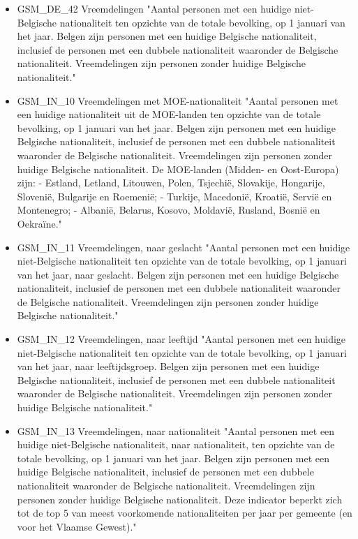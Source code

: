 \documentclass{SVnote}
\begin{document}
\begin{itemize}
\item GSM\_DE\_42	Vreemdelingen		"Aantal personen met een huidige niet-Belgische nationaliteit ten opzichte van de totale bevolking, op 1 januari van het jaar.
Belgen zijn personen met een huidige Belgische nationaliteit, inclusief de personen met een dubbele nationaliteit waaronder de Belgische nationaliteit. Vreemdelingen zijn personen zonder huidige Belgische nationaliteit."
\item GSM\_IN\_10	Vreemdelingen met MOE-nationaliteit		"Aantal personen met een huidige nationaliteit uit de MOE-landen ten opzichte van de totale bevolking, op 1 januari van het jaar.
Belgen zijn personen met een huidige Belgische nationaliteit, inclusief de personen met een dubbele nationaliteit waaronder de Belgische nationaliteit. Vreemdelingen zijn personen zonder huidige Belgische nationaliteit.
De MOE-landen (Midden- en Oost-Europa) zijn:
- Estland, Letland, Litouwen, Polen, Tsjechië, Slovakije, Hongarije, Slovenië, Bulgarije en Roemenië;
- Turkije, Macedonië, Kroatië, Servië en Montenegro;
- Albanië, Belarus, Kosovo, Moldavië, Rusland, Bosnië en Oekraïne."
\item GSM\_IN\_11	Vreemdelingen, naar geslacht		"Aantal personen met een huidige niet-Belgische nationaliteit ten opzichte van de totale bevolking, op 1 januari van het jaar, naar geslacht.
Belgen zijn personen met een huidige Belgische nationaliteit, inclusief de personen met een dubbele nationaliteit waaronder de Belgische nationaliteit. Vreemdelingen zijn personen zonder huidige Belgische nationaliteit."
\item GSM\_IN\_12	Vreemdelingen, naar leeftijd		"Aantal personen met een huidige niet-Belgische nationaliteit ten opzichte van de totale bevolking, op 1 januari van het jaar, naar leeftijdsgroep.
Belgen zijn personen met een huidige Belgische nationaliteit, inclusief de personen met een dubbele nationaliteit waaronder de Belgische nationaliteit. Vreemdelingen zijn personen zonder huidige Belgische nationaliteit."
\item GSM\_IN\_13	Vreemdelingen, naar nationaliteit		"Aantal personen met een huidige niet-Belgische nationaliteit, naar nationaliteit, ten opzichte van de totale bevolking, op 1 januari van het jaar.
Belgen zijn personen met een huidige Belgische nationaliteit, inclusief de personen met een dubbele nationaliteit waaronder de Belgische nationaliteit. Vreemdelingen zijn personen zonder huidige Belgische nationaliteit.
Deze indicator beperkt zich tot de top 5 van meest voorkomende nationaliteiten per jaar per gemeente (en voor het Vlaamse Gewest)."

\end{itemize}
\end{document}
